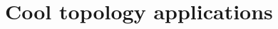 \documentclass[DIV=12,numbers=enddot,leqno,bibliography=totoc]{scrartcl}
\begin{document}
	\newpage
	
	
	
	
	
	
	\newpage
	\section[Cool topology applications]{Cool topology applications \coolemoji}\label{sec:CoolTopologyApplications}
	
	

	\newpage
	\renewcommand{\ParagraphOrNot}{}
	
	\renewcommand{\bibfont}{\small}
	
	\printbibliography
\end{document}
